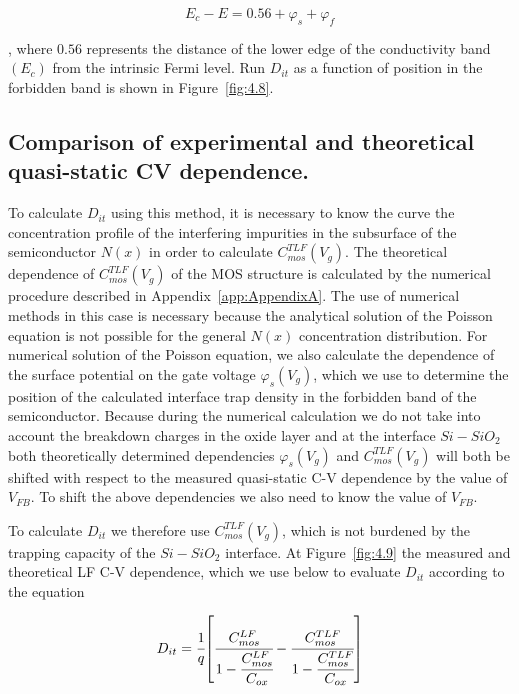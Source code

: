\begin{equation}\label{eq:4.17}
  E_{c} - E = 0.56 + \varphi_{s} + \varphi_{f}
\end{equation}

, where $0.56$ represents the distance of the lower edge of the
conductivity band $(E_{c})$ from the intrinsic Fermi level. Run
$D_{it}$ as a function of position in the forbidden band is shown
in Figure~\ref{fig:4.8}.

\subsection{Comparison of experimental and theoretical quasi-static CV dependence.}\label{sec:4.2.2}

To calculate $D_{it}$ using this method, it is necessary to know the
curve the concentration profile of the interfering impurities in
the subsurface of the semiconductor $N(x)$ in order to calculate
$C_{mos}^{TLF}(V_{g})$. The theoretical dependence of
$C_{mos}^{TLF}(V_{g})$ of the MOS structure is calculated by the
numerical procedure described in Appendix~\ref{app:AppendixA}.  The
use of numerical methods in this case is necessary because the
analytical solution of the Poisson equation is not possible for the
general $N(x)$ concentration distribution.  For numerical solution of
the Poisson equation, we also calculate the dependence of the surface
potential on the gate voltage $\varphi_{s}(V_{g})$, which we use to
determine the position of the calculated interface trap density in the
forbidden band of the semiconductor.  Because during the numerical
calculation we do not take into account the breakdown charges in the
oxide layer and at the interface $Si-SiO_{2}$ both theoretically
determined dependencies $\varphi_{s}(V_{g})$ and
$C_{mos}^{TLF}(V_{g})$ will both be shifted with respect to the
measured quasi-static C-V dependence by the value of $V_{FB}$. To
shift the above dependencies we also need to know the value of
$V_{FB}$.

\par To calculate $D_{it}$ we therefore use $C_{mos}^{TLF}(V_{g})$,
which is not burdened by the trapping capacity of the $Si-SiO_{2}$
interface. At Figure~\ref{fig:4.9} the measured and theoretical LF C-V
dependence, which we use below to evaluate $D_{it}$ according to the
equation

\begin{equation}\label{eq:4.18}
  D_{it} = {\cfrac{1}{q}} {\left[\cfrac{C_{mos}^{LF}}{1-\cfrac{C_{mos}^{LF}}{C_{ox}}}-\cfrac{C_{mos}^{TLF}}{1-\cfrac{C_{mos}^{TLF}}{C_{ox}}}\right]}
\end{equation}

